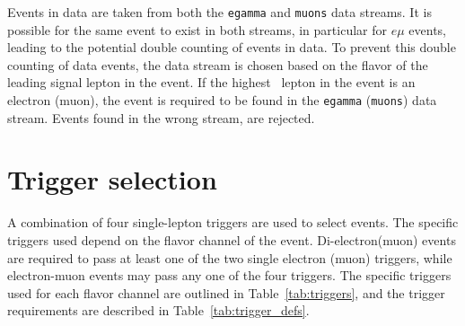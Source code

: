 Events in data are taken from both the \texttt{egamma} and \texttt{muons} data
streams.
It is possible for the same event to exist in both streams, in particular for
$e\mu$ events, leading to the potential double counting of events in data.
To prevent this double counting of data events, the data stream is chosen based
on the flavor of the leading signal lepton in the event.
If the highest \pt\ lepton in the event is an electron (muon), the event is
required to be found in the \texttt{egamma} (\texttt{muons}) data stream.
Events found in the wrong stream, are rejected.

\FloatBarrier
\section{Trigger selection}
\label{sec:trigger_selection}

A combination of four single-lepton triggers are used to select events.
The specific triggers used depend on the flavor channel of the event.
Di-electron(muon) events are required to pass at least one of the two single
electron (muon) triggers, while electron-muon events may pass any one of the
four triggers.
The specific triggers used for each flavor channel are outlined in
Table~\ref{tab:triggers}, and the trigger requirements are described in
Table~\ref{tab:trigger_defs}.

\begin{table}[ht]
  \caption[
    Trigger selection for each final state.
  ]{
    Trigger selection for each final state. If the event passes any of
    the triggers for the given final state, the event is accepted.
  }
  \label{tab:triggers}
\end{table}

